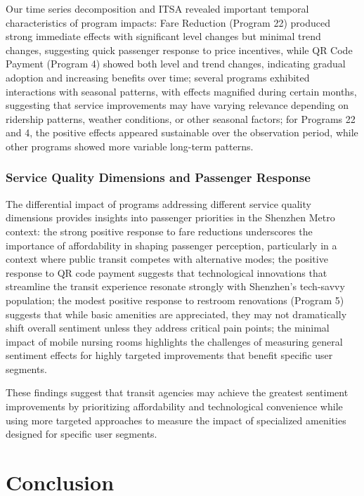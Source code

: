 \documentclass[a4paper,fleqn,12pt]{cas-sc}
\begin{document}
Our time series decomposition and ITSA revealed important temporal characteristics of program impacts: Fare Reduction (Program 22) produced strong immediate effects with significant level changes but minimal trend changes, suggesting quick passenger response to price incentives, while QR Code Payment (Program 4) showed both level and trend changes, indicating gradual adoption and increasing benefits over time; several programs exhibited interactions with seasonal patterns, with effects magnified during certain months, suggesting that service improvements may have varying relevance depending on ridership patterns, weather conditions, or other seasonal factors; for Programs 22 and 4, the positive effects appeared sustainable over the observation period, while other programs showed more variable long-term patterns.

\subsubsection{Service Quality Dimensions and Passenger Response}

The differential impact of programs addressing different service quality dimensions provides insights into passenger priorities in the Shenzhen Metro context: the strong positive response to fare reductions underscores the importance of affordability in shaping passenger perception, particularly in a context where public transit competes with alternative modes; the positive response to QR code payment suggests that technological innovations that streamline the transit experience resonate strongly with Shenzhen's tech-savvy population; the modest positive response to restroom renovations (Program 5) suggests that while basic amenities are appreciated, they may not dramatically shift overall sentiment unless they address critical pain points; the minimal impact of mobile nursing rooms highlights the challenges of measuring general sentiment effects for highly targeted improvements that benefit specific user segments.

These findings suggest that transit agencies may achieve the greatest sentiment improvements by prioritizing affordability and technological convenience while using more targeted approaches to measure the impact of specialized amenities designed for specific user segments.


\section{Conclusion}\label{sec:conclusion}
\end{document}
